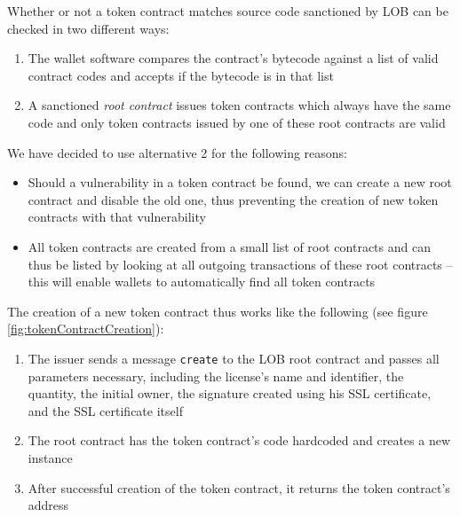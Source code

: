 \documentclass[a4paper]{article}
\begin{document}
Whether or not a token contract matches source code sanctioned by LOB can be checked in two different ways:
\begin{enumerate}
  \item The wallet software compares the contract's bytecode against a list of valid contract codes and accepts if the bytecode is in that list
  \item A sanctioned \emph{root contract} issues token contracts which always have the same code and only token contracts issued by one of these root contracts are valid
\end{enumerate}

We have decided to use alternative 2 for the following reasons:
\begin{itemize}
  \item Should a vulnerability in a token contract be found, we can create a new root contract and disable the old one, thus preventing the creation of new token contracts with that vulnerability
  \item All token contracts are created from a small list of root contracts and can thus be listed by looking at all outgoing transactions of these root contracts – this will enable wallets to automatically find all token contracts
\end{itemize}

The creation of a new token contract thus works like the following (see figure \ref{fig:tokenContractCreation}):
\begin{enumerate}
  \item The issuer sends a message \texttt{create} to the LOB root contract and passes all parameters necessary, including the license's name and identifier, the quantity, the initial owner, the signature created using his SSL certificate, and the SSL certificate itself
  \item The root contract has the token contract's code hardcoded and creates a new instance
  \item After successful creation of the token contract, it returns the token contract's address
\end{enumerate}
\end{document}
